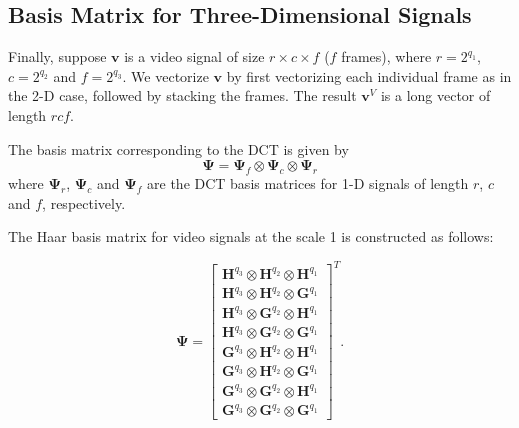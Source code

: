 \subsection{Basis Matrix for Three-Dimensional Signals}
Finally, suppose $\bm v$ is a video signal of size $r\times c\times f$ ($f$ frames), where $r=2^{q_1}$, $c=2^{q_2}$ and $f=2^{q_3}$.
We vectorize $\bm v$ by first vectorizing each individual frame as in the 2-D case, followed by stacking the frames.
The result $\bm v^V$ is a long vector of length $rcf$.

The basis matrix corresponding to the DCT is given by 
\begin{equation*}
  \bm\Psi = \bm\Psi_f\otimes\bm\Psi_c\otimes\bm\Psi_r
\end{equation*}
where $\bm\Psi_r$, $\bm\Psi_c$ and $\bm\Psi_f$ are the DCT basis matrices for 1-D signals of length $r$, $c$ and $f$, respectively.

The Haar basis matrix for video signals at the scale 1 is constructed as follows:

\begin{equation*}
  \bm\Psi = 
  \begin{bmatrix}
    \bm H^{q_3}\otimes \bm H^{q_2} \otimes\bm H^{q_1} \\
    \bm H^{q_3}\otimes \bm H^{q_2} \otimes \bm G^{q_1} \\
    \bm H^{q_3}\otimes \bm G^{q_2} \otimes \bm H^{q_1} \\
    \bm H^{q_3}\otimes \bm G^{q_2} \otimes \bm G^{q_1} \\
    \bm G^{q_3}\otimes \bm H^{q_2} \otimes\bm H^{q_1} \\
    \bm G^{q_3}\otimes \bm H^{q_2} \otimes \bm G^{q_1} \\
    \bm G^{q_3}\otimes \bm G^{q_2} \otimes \bm H^{q_1} \\
    \bm G^{q_3}\otimes \bm G^{q_2} \otimes \bm G^{q_1} 
  \end{bmatrix}^T.
\end{equation*}

